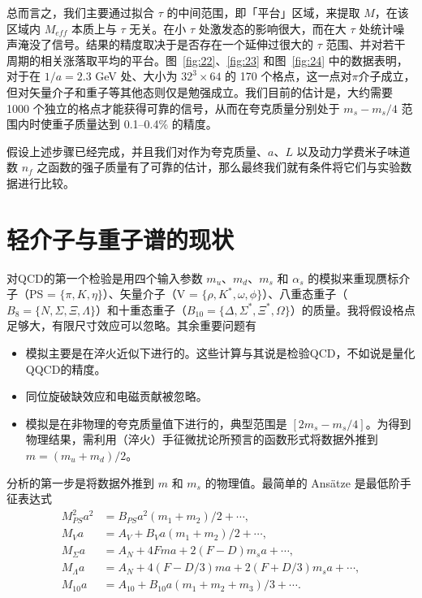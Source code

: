 总而言之，我们主要通过拟合 $\tau$ 的中间范围，即「平台」区域，来提取 $M$，在该区域内 $M_{eff}$ 本质上与 $\tau$ 无关。在小 $\tau$ 处激发态的影响很大，而在大 $\tau$ 处统计噪声淹没了信号。结果的精度取决于是否存在一个延伸过很大的 $\tau$ 范围、并对若干周期的相关涨落取平均的平台。图~\ref{fig:22}、\ref{fig:23} 和图~\ref{fig:24} 中的数据表明，对于在 $1/a = 2.3$ GeV 处、大小为 $32^3 \times 64$ 的 170 个格点，这一点对$\pi$介子成立，但对矢量介子和重子等其他态则仅是勉强成立。我们目前的估计是，大约需要 1000 个独立的格点才能获得可靠的信号，从而在夸克质量分别处于 $m_s - m_s/4$ 范围内时使重子质量达到 0.1--0.4\% 的精度。

假设上述步骤已经完成，并且我们对作为夸克质量、$a$、$L$ 以及动力学费米子味道数 $n_f$ 之函数的强子质量有了可靠的估计，那么最终我们就有条件将它们与实验数据进行比较。

\section{轻介子与重子谱的现状}

对QCD的第一个检验是用四个输入参数 $m_u$、$m_d$、$m_s$ 和 $\alpha_s$ 的模拟来重现赝标介子（PS = $\{\pi, K, \eta\}$）、矢量介子（V = $\{\rho, K^*, \omega, \phi\}$）、八重态重子（$B_8 = \{N, \Sigma, \Xi, \Lambda\}$）和十重态重子（$B_{10} = \{\Delta, \Sigma^*, \Xi^*, \Omega\}$）的质量。我将假设格点足够大，有限尺寸效应可以忽略。其余重要问题有
\begin{itemize}
\item 模拟主要是在淬火近似下进行的。这些计算与其说是检验QCD，不如说是量化QQCD的精度。
\item 同位旋破缺效应和电磁贡献被忽略。
\item 模拟是在非物理的夸克质量值下进行的，典型范围是 $[2m_s - m_s/4]$。为得到物理结果，需利用（淬火）手征微扰论所预言的函数形式将数据外推到 $m = (m_u + m_d)/2$。
\end{itemize}

分析的第一步是将数据外推到 $m$ 和 $m_s$ 的物理值。最简单的 Ans\"atze 是最低阶手征表达式
\begin{equation}
\begin{aligned}
M_{PS}^2 a^2 &= B_{PS} a^2 (m_1 + m_2)/2 + \cdots, \\
M_V a &= A_V + B_V a (m_1 + m_2)/2 + \cdots, \\
M_\Sigma a &= A_N + 4F m a + 2(F - D) m_s a + \cdots, \\
M_\Lambda a &= A_N + 4(F - D/3) m a + 2(F + D/3) m_s a + \cdots, \\
M_{10} a &= A_{10} + B_{10} a (m_1 + m_2 + m_3)/3 + \cdots.
\end{aligned}
\label{eq:chiral}
\end{equation}

